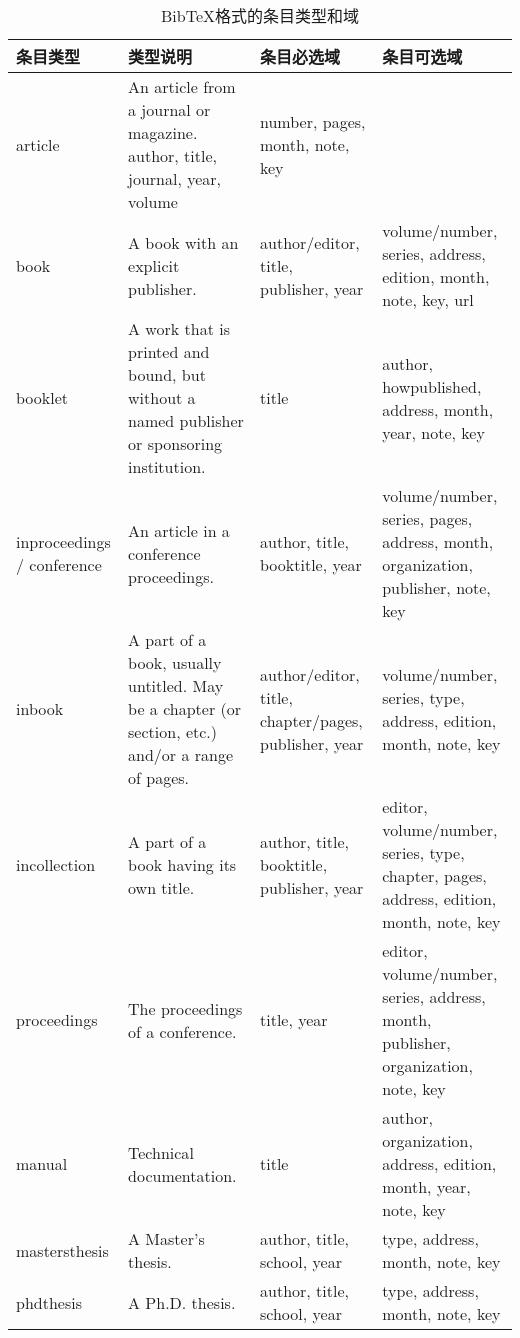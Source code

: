 \documentclass[twoside]{article} %
\begin{document}
\begin{table}[!htb]
\centering
\caption{BibTeX格式的条目类型和域}\label{tab:bibtex:fmt}
\footnotesize
\begin{tabular}{p{2cm}p{3cm}p{3cm}p{6cm}}
   \hline
条目类型 & 类型说明 & 条目必选域 & 条目可选域 \\ \hline
article & An article from a journal or magazine.
author, title, journal,
year, volume &
number, pages, month, note, key\\

book & A book with an explicit
publisher. &
author/editor, title,
publisher, year &
volume/number, series, address, edition, month,
note, key, url \\

booklet & A work that is printed
and bound, but without a named publisher or sponsoring institution. &
title &
author, howpublished, address, month, year, note, key \\

inproceedings / conference & An article in a conference proceedings.
& author, title, booktitle, year & volume/number, series, pages, address, month, organization, publisher, note, key\\

inbook &
A part of a book, usually untitled. May be a chapter (or section, etc.) and/or a range of pages. &
author/editor, title, chapter/pages, publisher, year &
volume/number, series, type, address, edition, month, note, key \\

incollection &
A part of a book having its own title. &
author, title, booktitle, publisher, year &
editor, volume/number, series, type, chapter, pages, address, edition, month, note, key \\

proceedings &
The proceedings of a conference. &
title, year &
editor, volume/number, series, address, month, publisher, organization, note, key \\

manual &
Technical documentation. &
title &
author, organization, address, edition, month, year, note, key \\

mastersthesis &
A Master's thesis. &
author, title, school, year &
type, address, month, note, key \\

phdthesis &
A Ph.D. thesis. &
author, title, school, year &
type, address, month, note, key \\


\end{tabular}
\end{table}
\end{document}
